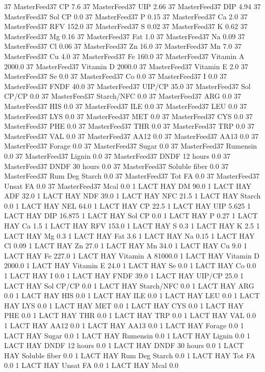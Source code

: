 \documentclass[letterpaper,10pt,english]{sphinxmanual}
\begin{document}
\begin{sphinxVerbatim}[commandchars=\\\{\},numbers=left,firstnumber=1,stepnumber=1]
37 MasterFeed37 CP 7.6
37 MasterFeed37 UIP 2.66
37 MasterFeed37 DIP 4.94
37 MasterFeed37 Sol CP 0.0
37 MasterFeed37 P 0.15
37 MasterFeed37 Ca 2.0
37 MasterFeed37 RFV 152.0
37 MasterFeed37 S 0.02
37 MasterFeed37 K 0.62
37 MasterFeed37 Mg 0.16
37 MasterFeed37 Fat 1.0
37 MasterFeed37 Na 0.09
37 MasterFeed37 Cl 0.06
37 MasterFeed37 Zn 16.0
37 MasterFeed37 Mn 7.0
37 MasterFeed37 Cu 4.0
37 MasterFeed37 Fe 160.0
37 MasterFeed37 Vitamin A 2000.0
37 MasterFeed37 Vitamin D 2000.0
37 MasterFeed37 Vitamin E 2.0
37 MasterFeed37 Se 0.0
37 MasterFeed37 Co 0.0
37 MasterFeed37 I 0.0
37 MasterFeed37 FNDF 40.0
37 MasterFeed37 UIP/CP 35.0
37 MasterFeed37 Sol CP/CP 0.0
37 MasterFeed37 Starch/NFC 0.0
37 MasterFeed37 ARG 0.0
37 MasterFeed37 HIS 0.0
37 MasterFeed37 ILE 0.0
37 MasterFeed37 LEU 0.0
37 MasterFeed37 LYS 0.0
37 MasterFeed37 MET 0.0
37 MasterFeed37 CYS 0.0
37 MasterFeed37 PHE 0.0
37 MasterFeed37 THR 0.0
37 MasterFeed37 TRP 0.0
37 MasterFeed37 VAL 0.0
37 MasterFeed37 AA\PYGZsh{}12 0.0
37 MasterFeed37 AA\PYGZsh{}13 0.0
37 MasterFeed37 \PYGZpc{} Forage 0.0
37 MasterFeed37 Sugar \PYGZpc{} 0.0
37 MasterFeed37 Rumensin 0.0
37 MasterFeed37 Lignin 0.0
37 MasterFeed37 DNDF 12 hours 0.0
37 MasterFeed37 DNDF 30 hours 0.0
37 MasterFeed37 Soluble fiber 0.0
37 MasterFeed37 Rum Deg Starch 0.0
37 MasterFeed37 Tot FA 0.0
37 MasterFeed37 Unsat FA 0.0
37 MasterFeed37 Mcal 0.0
1 LACT HAY DM 90.0
1 LACT HAY ADF 32.0
1 LACT HAY NDF 39.0
1 LACT HAY NFC 21.5
1 LACT HAY Starch 0.0
1 LACT HAY NEL 64.0
1 LACT HAY CP 22.5
1 LACT HAY UIP 5.625
1 LACT HAY DIP 16.875
1 LACT HAY Sol CP 0.0
1 LACT HAY P 0.27
1 LACT HAY Ca 1.5
1 LACT HAY RFV 153.0
1 LACT HAY S 0.3
1 LACT HAY K 2.5
1 LACT HAY Mg 0.3
1 LACT HAY Fat 3.6
1 LACT HAY Na 0.15
1 LACT HAY Cl 0.09
1 LACT HAY Zn 27.0
1 LACT HAY Mn 34.0
1 LACT HAY Cu 9.0
1 LACT HAY Fe 227.0
1 LACT HAY Vitamin A 81000.0
1 LACT HAY Vitamin D 2000.0
1 LACT HAY Vitamin E 24.0
1 LACT HAY Se 0.0
1 LACT HAY Co 0.0
1 LACT HAY I 0.0
1 LACT HAY FNDF 39.0
1 LACT HAY UIP/CP 25.0
1 LACT HAY Sol CP/CP 0.0
1 LACT HAY Starch/NFC 0.0
1 LACT HAY ARG 0.0
1 LACT HAY HIS 0.0
1 LACT HAY ILE 0.0
1 LACT HAY LEU 0.0
1 LACT HAY LYS 0.0
1 LACT HAY MET 0.0
1 LACT HAY CYS 0.0
1 LACT HAY PHE 0.0
1 LACT HAY THR 0.0
1 LACT HAY TRP 0.0
1 LACT HAY VAL 0.0
1 LACT HAY AA\PYGZsh{}12 0.0
1 LACT HAY AA\PYGZsh{}13 0.0
1 LACT HAY \PYGZpc{} Forage 0.0
1 LACT HAY Sugar \PYGZpc{} 0.0
1 LACT HAY Rumensin 0.0
1 LACT HAY Lignin 0.0
1 LACT HAY DNDF 12 hours 0.0
1 LACT HAY DNDF 30 hours 0.0
1 LACT HAY Soluble fiber 0.0
1 LACT HAY Rum Deg Starch 0.0
1 LACT HAY Tot FA 0.0
1 LACT HAY Unsat FA 0.0
1 LACT HAY Mcal 0.0

\end{sphinxVerbatim}
\end{document}
